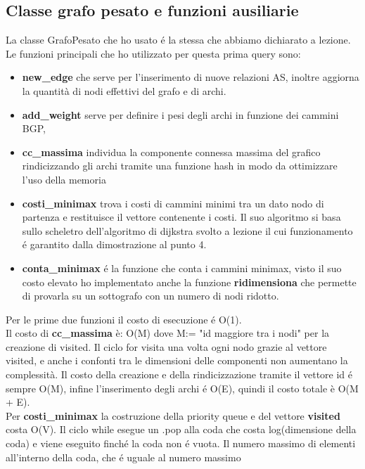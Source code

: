 \documentclass {article}
\begin{document}
\subsection{Classe grafo pesato e funzioni ausiliarie}
La classe GrafoPesato che ho usato é la stessa che abbiamo dichiarato
a lezione. Le funzioni principali che ho utilizzato per questa prima
query sono:

\begin{itemize}
\item   \textbf{new\_edge} che serve per l'inserimento di nuove relazioni AS,
        inoltre aggiorna la quantità di nodi effettivi del grafo
        e di archi.
\item   \textbf{add\_weight} serve per definire i pesi 
        degli archi in funzione dei cammini BGP,
\item   \textbf{cc\_massima} individua la componente connessa massima del grafico 
        rindicizzando gli archi tramite una funzione hash in modo da ottimizzare l'uso della memoria
\item   \textbf{costi\_minimax} trova i costi di cammini minimi tra un
        dato nodo di partenza e restituisce il vettore contenente i costi.
        Il suo algoritmo si basa sullo scheletro dell'algoritmo 
        di dijkstra svolto a lezione il cui funzionamento 
        é garantito dalla dimostrazione al punto 4.
\item   \textbf{conta\_minimax} é la funzione che conta i cammini
        minimax, visto il suo costo elevato ho implementato anche
        la funzione \textbf{ridimensiona} che permette di provarla
        su un sottografo con un numero di nodi ridotto.
\end{itemize}
Per le prime due funzioni il costo di esecuzione é O(1). \\
Il costo di \textbf{cc\_massima} è: O(M) dove M:= "id maggiore tra i nodi"
per la creazione di visited.
Il ciclo for visita una volta ogni nodo grazie al vettore visited, 
e anche i confonti tra le dimensioni delle componenti non aumentano
la complessità. Il costo della creazione e della rindicizzazione 
tramite il vettore id é sempre O(M), infine l'inserimento degli
archi é O(E), quindi il costo totale è O(M + E).
\\Per \textbf{costi\_minimax} la costruzione della priority queue 
e del vettore 
\textbf{visited} costa  O(V). 
Il ciclo while esegue un .pop alla coda che costa log(dimensione
 della coda) 
e viene eseguito finché la coda non é vuota. Il numero massimo di 
elementi all'interno della coda, che é uguale al numero massimo 
\end{document}

